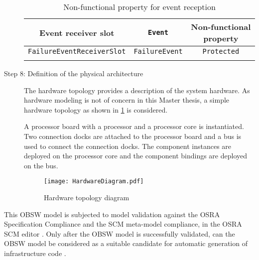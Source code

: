 \begin{description}
\begin{table}[]
	\centering
	\caption{Non-functional property for event reception}
	\label{table: NFP ER Port}
	\begin{tabular}{ccc}
		\hline
		\multicolumn{1}{|c|}{\textbf{Event receiver slot}} & \multicolumn{1}{c|}{\textbf{\texttt{Event}}} & \multicolumn{1}{c|}{\textbf{Non-functional property}} \\ \hline
		\multicolumn{1}{|c|}{\texttt{FailureEventReceiverSlot}} & \multicolumn{1}{c|}{\texttt{FailureEvent}} & \multicolumn{1}{c|}{\texttt{Protected}} \\ \hline
		\multicolumn{1}{l}{} & \multicolumn{1}{l}{} & \multicolumn{1}{l}{}
	\end{tabular}
\end{table}

\item [Step 8: Definition of the physical architecture] The hardware topology provides a description of the system hardware. As hardware modeling is not of concern in this Master thesis, a simple hardware topology as shown in \cref{fig: Ex. Hardware topology} is considered. 

A processor board with a processor and a processor core is instantiated. Two connection docks are attached to the processor board and a bus is used to connect the connection docks. The component instances are deployed on the processor core and the component bindings are deployed on the bus.

\begin{figure}[h]
	\centering
	\texttt{[image: HardwareDiagram.pdf]}
	\caption{Hardware topology diagram}
	\label{fig: Ex. Hardware topology}
\end{figure}
 
\end{description}

This OBSW model is subjected to model validation against the OSRA Specification Compliance and the SCM meta-model compliance, in the OSRA SCM editor \cite{OSRAEditor}. Only after the OBSW model is successfully validated, can the OBSW model be considered as a suitable candidate for automatic generation of infrastructure code \cite{OSRAEditor}.  
   
